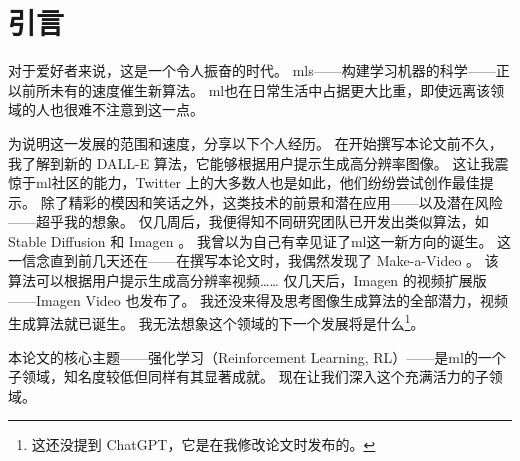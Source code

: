 
\chapter{引言}

对于爱好者来说，这是一个令人振奋的时代。
\glspl{ml}——构建学习机器的科学——正以前所未有的速度催生新算法。
\gls{ml}也在日常生活中占据更大比重，即使远离该领域的人也很难不注意到这一点。

为说明这一发展的范围和速度，分享以下个人经历。
在开始撰写本论文前不久，我了解到新的 DALL-E \cite{ramesh2022hierarchical} 算法，它能够根据用户提示生成高分辨率图像。
这让我震惊于\gls{ml}社区的能力，Twitter 上的大多数人也是如此，他们纷纷尝试创作最佳提示。
除了精彩的模因和笑话之外，这类技术的前景和潜在应用——以及潜在风险——超乎我的想象。
仅几周后，我便得知不同研究团队已开发出类似算法，如 Stable Diffusion \cite{rombach2021highresolution} 和 Imagen \cite{saharia2022photorealistic}。
我曾以为自己有幸见证了\gls{ml}这一新方向的诞生。
这一信念直到前几天还在——在撰写本论文时，我偶然发现了 Make-a-Video \cite{singer2022make}。
该算法可以根据用户提示生成高分辨率视频……
仅几天后，Imagen 的视频扩展版——Imagen Video \cite{ho2022imagen} 也发布了。
我还没来得及思考图像生成算法的全部潜力，视频生成算法就已诞生。
我无法想象这个领域的下一个发展将是什么\footnote{这还没提到 ChatGPT，它是在我修改论文时发布的。}。

本论文的核心主题——强化学习（Reinforcement Learning, RL）\cite{sutton2018reinforcement}——是\gls{ml}的一个子领域，知名度较低但同样有其显著成就。
现在让我们深入这个充满活力的子领域。





